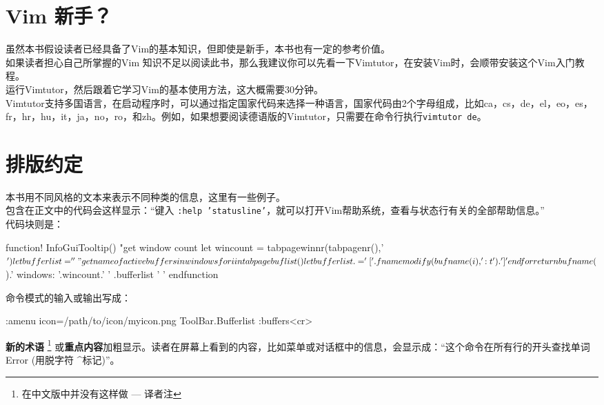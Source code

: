 \section*{Vim 新手？}
\label{sec:new_to_vim}
虽然本书假设读者已经具备了Vim的基本知识，但即使是新手，本书也有一定的参考价值。\\

如果读者担心自己所掌握的Vim 知识不足以阅读此书，那么我建议你可以先看一下Vimtutor，在安装Vim时，会顺带安装这个Vim入门教程。\\

运行Vimtutor，然后跟着它学习Vim的基本使用方法，这大概需要30分钟。\\

Vimtutor支持多国语言，在启动程序时，可以通过指定国家代码来选择一种语言，国家代码由2个字母组成，比如ca，cs，de，el，eo，es，fr，hr，hu，it，ja，no，ro，和zh。例如，如果想要阅读德语版的Vimtutor，只需要在命令行执行\texttt{vimtutor de}。\\

\section*{排版约定}
\label{sec:conventions}
本书用不同风格的文本来表示不同种类的信息，这里有一些例子。\\

包含在正文中的代码会这样显示：``键入 \texttt{:help 'statusline'}，就可以打开Vim帮助系统，查看与状态行有关的全部帮助信息。''\\

代码块则是：
\begin{vimcode}
function! InfoGuiTooltip()
    "get window count
    let wincount = tabpagewinnr(tabpagenr(),'$')
    let bufferlist=''
    "get name of active buffers in windows
    for i in tabpagebuflist()
        let bufferlist .= '['.fnamemodify(bufname(i),':t').'] '
    endfor
    return bufname($).' windows: '.wincount.' ' .bufferlist ' '
endfunction
\end{vimcode}

命令模式的输入或输出写成：\\
\begin{vimcode}
:amenu icon=/path/to/icon/myicon.png ToolBar.Bufferlist :buffers<cr>
\end{vimcode}

\textbf{新的术语} \footnote{在中文版中并没有这样做 --- 译者注} 或\textbf{重点内容}加粗显示。读者在屏幕上看到的内容，比如菜单或对话框中的信息，会显示成：``这个命令在所有行的开头查找单词Error (用脱字符 \textasciicircum 标记)''。\\

